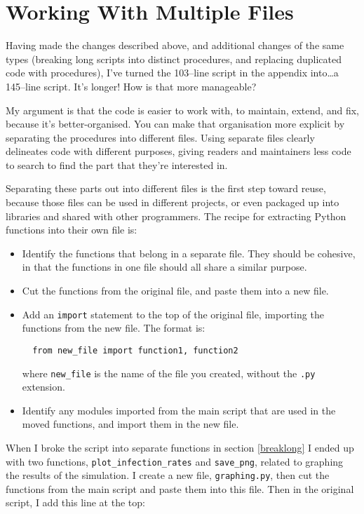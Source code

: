 \documentclass[a4paper]{article}
\begin{document}
\section{Working With Multiple Files}
Having made the changes described above, and additional changes of the same types (breaking long scripts into distinct procedures, and replacing duplicated code with procedures), I've turned the 103--line script in the appendix into\ldots a 145--line script.
It's longer! How is that more manageable?

My argument is that the code is easier to work with, to maintain, extend, and fix, because it's better-organised.
You can make that organisation more explicit by separating the procedures into different files.
Using separate files clearly delineates code with different purposes, giving readers and maintainers less code to search to find the part that they're interested in.

Separating these parts out into different files is the first step toward reuse, because those files can be used in different projects, or even packaged up into libraries and shared with other programmers.
The recipe for extracting Python functions into their own file is:

\begin{itemize}
\item Identify the functions that belong in a separate file. They should be cohesive, in that the functions in one file should all share a similar purpose.
\item Cut the functions from the original file, and paste them into a new file.
\item Add an \texttt{import} statement to the top of the original file, importing the functions from the new file. The format is:
\begin{verbatim}
  from new_file import function1, function2
\end{verbatim}
where \texttt{new\_file} is the name of the file you created, without the \texttt{.py} extension.
\item Identify any modules imported from the main script that are used in the moved functions, and import them in the new file.
\end{itemize}

When I broke the script into separate functions in section \ref{breaklong} I ended up with two functions, \texttt{plot\_infection\_rates} and \texttt{save\_png}, related to graphing the results of the simulation.
I create a new file, \texttt{graphing.py}, then cut the functions from the main script and paste them into this file.
Then in the original script, I add this line at the top:
\end{document}
